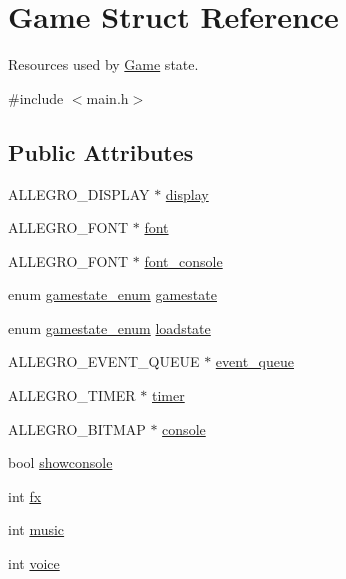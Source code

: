 \hypertarget{structGame}{\section{\-Game \-Struct \-Reference}
\label{structGame}
}


\-Resources used by \hyperlink{structGame}{\-Game} state.  




{\ttfamily \#include $<$main.\-h$>$}

\subsection*{\-Public \-Attributes}
\begin{DoxyCompactItemize}
\item 
\-A\-L\-L\-E\-G\-R\-O\-\_\-\-D\-I\-S\-P\-L\-A\-Y $\ast$ \hyperlink{structGame_a2bf8ece79fe05b03c31f2e2ede42e5f5}{display}
\item 
\-A\-L\-L\-E\-G\-R\-O\-\_\-\-F\-O\-N\-T $\ast$ \hyperlink{structGame_a455bfdaacd5f2bda80b640c02ec3250e}{font}
\item 
\-A\-L\-L\-E\-G\-R\-O\-\_\-\-F\-O\-N\-T $\ast$ \hyperlink{structGame_a692f2c3ec0f3e956aa8bdac00a864bf8}{font\-\_\-console}
\item 
enum \hyperlink{main_8h_ae1e9f94402d151ae1adc212237a6d153}{gamestate\-\_\-enum} \hyperlink{structGame_a5118a01ee6bb74fb41e8e8880a5b85a2}{gamestate}
\item 
enum \hyperlink{main_8h_ae1e9f94402d151ae1adc212237a6d153}{gamestate\-\_\-enum} \hyperlink{structGame_a026bb8ebb6454c0d87dea503eafa9197}{loadstate}
\item 
\-A\-L\-L\-E\-G\-R\-O\-\_\-\-E\-V\-E\-N\-T\-\_\-\-Q\-U\-E\-U\-E $\ast$ \hyperlink{structGame_a820782e408ff7a704dc12af67eb0c44f}{event\-\_\-queue}
\item 
\-A\-L\-L\-E\-G\-R\-O\-\_\-\-T\-I\-M\-E\-R $\ast$ \hyperlink{structGame_a8d6d4f06c6412d085112cd007977d868}{timer}
\item 
\-A\-L\-L\-E\-G\-R\-O\-\_\-\-B\-I\-T\-M\-A\-P $\ast$ \hyperlink{structGame_aa2e3d0922374dc870a1aeabf9e3b8ae2}{console}
\item 
bool \hyperlink{structGame_ab1dafa4ce0c3526439418ac24bf616d8}{showconsole}
\item 
int \hyperlink{structGame_a10c0e81918f42e7367b4590e6885048e}{fx}
\item 
int \hyperlink{structGame_aa8eff7d132a51e5ca97a376433790426}{music}
\item 
int \hyperlink{structGame_a5523ac4fdb8fdbd2e86b58a3fbc2e6d0}{voice}

\end{DoxyCompactItemize}
